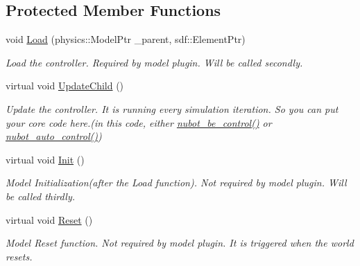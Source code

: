 \subsection*{Protected Member Functions}
\begin{DoxyCompactItemize}
\item 
void \hyperlink{classgazebo_1_1NubotGazebo_aa1eea79757774a935fe82a5fbc1b3f94}{Load} (physics\-::\-Model\-Ptr \-\_\-parent, sdf\-::\-Element\-Ptr)
\begin{DoxyCompactList}\small\item\em Load the controller. Required by model plugin. Will be called secondly. \end{DoxyCompactList}\item 
virtual void \hyperlink{classgazebo_1_1NubotGazebo_a9d2bb8130da6d209089f5ee469427ca4}{Update\-Child} ()
\begin{DoxyCompactList}\small\item\em Update the controller. It is running every simulation iteration. So you can put your core code here.(in this code, either \hyperlink{classgazebo_1_1NubotGazebo_aaa7835337bbfd120b5b85af40ccf47ae}{nubot\-\_\-be\-\_\-control()} or \hyperlink{classgazebo_1_1NubotGazebo_a991cc13697cbd1eaf855d21e4f5d78d2}{nubot\-\_\-auto\-\_\-control()}) \end{DoxyCompactList}\item 
virtual void \hyperlink{classgazebo_1_1NubotGazebo_abf91360d6ce9b5f2cf02c3907100495e}{Init} ()
\begin{DoxyCompactList}\small\item\em Model Initialization(after the Load function). Not required by model plugin. Will be called thirdly. \end{DoxyCompactList}\item 
virtual void \hyperlink{classgazebo_1_1NubotGazebo_aefa336771bb8dffca92a2919352b62bc}{Reset} ()
\begin{DoxyCompactList}\small\item\em Model Reset function. Not required by model plugin. It is triggered when the world resets. \end{DoxyCompactList}\end{DoxyCompactItemize}
